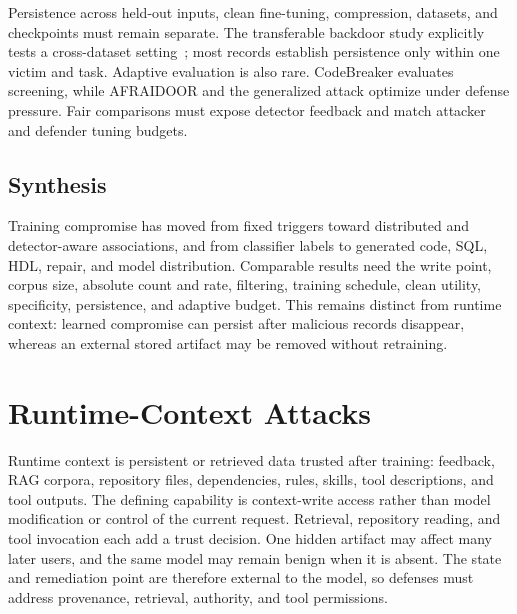 \documentclass[acmsmall,screen,review]{acmart}
\begin{document}
Persistence across held-out inputs, clean fine-tuning, compression, datasets, and checkpoints must remain separate. The transferable backdoor study explicitly tests a cross-dataset setting~\cite{transferable2026backdoor}; most records establish persistence only within one victim and task. Adaptive evaluation is also rare. CodeBreaker evaluates screening, while AFRAIDOOR and the generalized attack optimize under defense pressure. Fair comparisons must expose detector feedback and match attacker and defender tuning budgets.

\subsection{Synthesis} \label{sec:poison:discussion}
Training compromise has moved from fixed triggers toward distributed and detector-aware associations, and from classifier labels to generated code, SQL, HDL, repair, and model distribution. Comparable results need the write point, corpus size, absolute count and rate, filtering, training schedule, clean utility, specificity, persistence, and adaptive budget. This remains distinct from runtime context: learned compromise can persist after malicious records disappear, whereas an external stored artifact may be removed without retraining.

\section{Runtime-Context Attacks} \label{sec:runtime}

Runtime context is persistent or retrieved data trusted after training: feedback, RAG corpora, repository files, dependencies, rules, skills, tool descriptions, and tool outputs. The defining capability is context-write access rather than model modification or control of the current request. Retrieval, repository reading, and tool invocation each add a trust decision. One hidden artifact may affect many later users, and the same model may remain benign when it is absent. The state and remediation point are therefore external to the model, so defenses must address provenance, retrieval, authority, and tool permissions.
\end{document}
